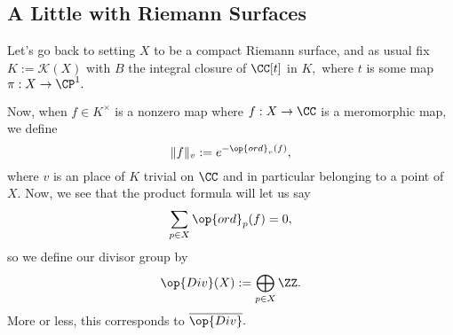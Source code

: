 \documentclass[../notes.tex]{subfiles}
\begin{document}
\subsection{A Little with Riemann Surfaces}
Let's go back to setting $X$ to be a compact Riemann surface, and as usual fix $K:=\mathcal K(X)$ with $B$ the integral closure of $\CC[t]$ in $K,$ where $t$ is some map $\pi:X\to\CP^1.$

Now, when $f\in K^\times$ is a nonzero map where $f:X\to\CC$ is a meromorphic map, we define
\[\lVert f\rVert_v:=e^{-\op{ord}_v(f)},\]
where $v$ is an place of $K$ trivial on $\CC$ and in particular belonging to a point of $X.$ Now, we see that the product formula will let us say
\[\sum_{p\in X}\op{ord}_p(f)=0,\]
so we define our divisor group by
\[\op{Div}(X):=\bigoplus_{p\in X}\ZZ.\]
More or less, this corresponds to $\overline{\op{Div}}.$
\end{document}
